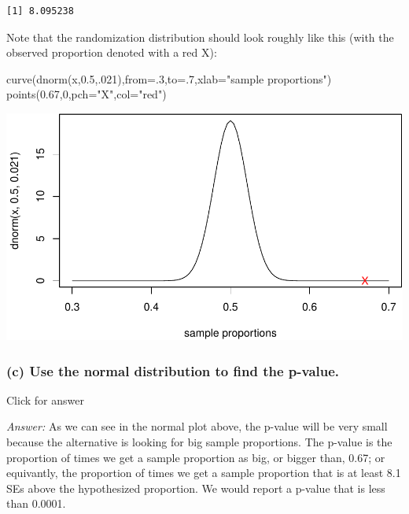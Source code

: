 \documentclass[
]{book}
\newenvironment{Shaded}{\begin{snugshade}}{\end{snugshade}}
\newcommand{\AttributeTok}[1]{\textcolor[rgb]{0.77,0.63,0.00}{#1}}
\newcommand{\DecValTok}[1]{\textcolor[rgb]{0.00,0.00,0.81}{#1}}
\newcommand{\FloatTok}[1]{\textcolor[rgb]{0.00,0.00,0.81}{#1}}
\newcommand{\FunctionTok}[1]{\textcolor[rgb]{0.00,0.00,0.00}{#1}}
\newcommand{\NormalTok}[1]{#1}
\newcommand{\StringTok}[1]{\textcolor[rgb]{0.31,0.60,0.02}{#1}}
\begin{document}
\begin{verbatim}
[1] 8.095238
\end{verbatim}

Note that the randomization distribution should look roughly like this (with the observed proportion denoted with a red X):

\begin{Shaded}
\begin{Highlighting}[]
\FunctionTok{curve}\NormalTok{(}\FunctionTok{dnorm}\NormalTok{(x,}\FloatTok{0.5}\NormalTok{,.}\DecValTok{021}\NormalTok{),}\AttributeTok{from=}\NormalTok{.}\DecValTok{3}\NormalTok{,}\AttributeTok{to=}\NormalTok{.}\DecValTok{7}\NormalTok{,}\AttributeTok{xlab=}\StringTok{"sample proportions"}\NormalTok{)}
\FunctionTok{points}\NormalTok{(}\FloatTok{0.67}\NormalTok{,}\DecValTok{0}\NormalTok{,}\AttributeTok{pch=}\StringTok{"X"}\NormalTok{,}\AttributeTok{col=}\StringTok{"red"}\NormalTok{)}
\end{Highlighting}
\end{Shaded}

\includegraphics[width=1\linewidth]{Class_Activity_16_files/figure-latex/unnamed-chunk-2-1}

\hypertarget{c-use-the-normal-distribution-to-find-the-p-value.}{%
\subsubsection{(c) Use the normal distribution to find the p-value.}\label{c-use-the-normal-distribution-to-find-the-p-value.}}

Click for answer

\emph{Answer:} As we can see in the normal plot above, the p-value will be very small because the alternative is looking for big sample proportions. The p-value is the proportion of times we get a sample proportion as big, or bigger than, 0.67; or equivantly, the proportion of times we get a sample proportion that is at least 8.1 SEs above the hypothesized proportion. We would report a p-value that is less than 0.0001.
\end{document}
